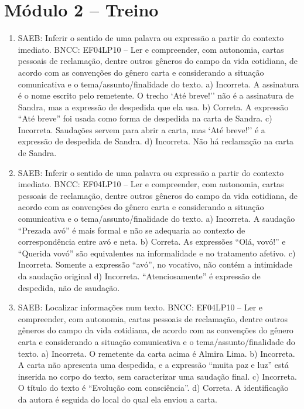 \section*{Módulo 2 – Treino}

\begin{enumerate}
\item
SAEB: Inferir o sentido de uma palavra ou expressão a partir do
contexto imediato.
BNCC: EF04LP10 -- Ler e compreender, com autonomia, cartas pessoais de
reclamação, dentre outros gêneros do campo da vida cotidiana, de acordo
com as convenções do gênero carta e considerando a situação comunicativa
e o tema/assunto/finalidade do texto.
a) Incorreta. A assinatura é o nome escrito pelo remetente. O trecho `Até 
breve!'' não é a assinatura de Sandra, mas a expressão de despedida que 
ela usa.
b) Correta. A expressão ``Até breve'' foi usada como forma de despedida 
na carta de Sandra.
c) Incorreta. Saudações servem para abrir a carta, mas `Até breve!'' é a 
expressão de despedida de Sandra.   
d) Incorreta. Não há reclamação na carta de Sandra.

\item
SAEB: Inferir o sentido de uma palavra ou expressão a partir do
contexto imediato.
BNCC: EF04LP10 -- Ler e compreender, com autonomia, cartas pessoais
de reclamação, dentre outros gêneros do campo da vida cotidiana, de
acordo com as convenções do gênero carta e considerando a situação
comunicativa e o tema/assunto/finalidade do texto.
a) Incorreta. A saudação ``Prezada avó'' é mais formal e não se adequaria
ao contexto de correspondência entre avó e neta.
b) Correta. As expressões ``Olá, vovó!'' e ``Querida vovó'' são 
equivalentes na informalidade e no tratamento afetivo. 
c) Incorreta. Somente a expressão ``avó'', no vocativo, não contém
a intimidade da saudação original
d) Incorreta. ``Atenciosamente'' é expressão de despedida, não de saudação.

\item
SAEB: Localizar informações num texto.
BNCC: EF04LP10 -- Ler e compreender, com autonomia, cartas pessoais de
reclamação, dentre outros gêneros do campo da vida cotidiana, de acordo
com as convenções do gênero carta e considerando a situação comunicativa
e o tema/assunto/finalidade do texto.
a) Incorreta. O remetente da carta acima é Almira Lima.
b)  Incorreta. A carta não apresenta uma despedida, e a expressão ``muita 
paz e luz'' está inserida no corpo do texto, sem caracterizar uma 
saudação final. 
c) Incorreta. O título do texto é ``Evolução com consciência''.
d) Correta. A identificação da autora é seguida do local do qual ela
enviou a carta.
\end{enumerate}

